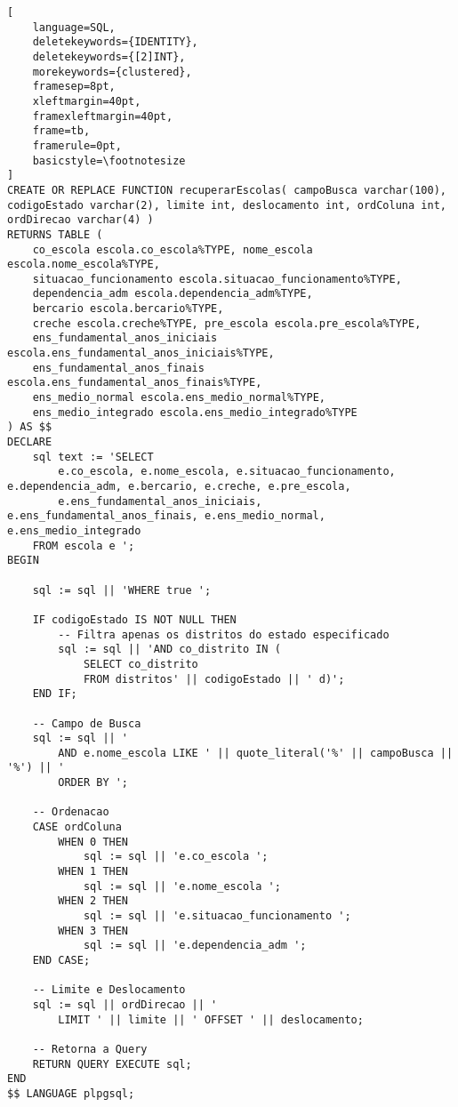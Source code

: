 \documentclass[12pt,a4paper]{article}
\begin{document}
\vspace{0.5cm}

\begin{lstlisting}[ 
    language=SQL,
    deletekeywords={IDENTITY},
    deletekeywords={[2]INT},
    morekeywords={clustered},
    framesep=8pt,
    xleftmargin=40pt,
    framexleftmargin=40pt,
    frame=tb,
    framerule=0pt,
    basicstyle=\footnotesize
]
CREATE OR REPLACE FUNCTION recuperarEscolas( campoBusca varchar(100), codigoEstado varchar(2), limite int, deslocamento int, ordColuna int, ordDirecao varchar(4) )  
RETURNS TABLE (
    co_escola escola.co_escola%TYPE, nome_escola escola.nome_escola%TYPE,
    situacao_funcionamento escola.situacao_funcionamento%TYPE,
    dependencia_adm escola.dependencia_adm%TYPE, 
    bercario escola.bercario%TYPE,
    creche escola.creche%TYPE, pre_escola escola.pre_escola%TYPE,
    ens_fundamental_anos_iniciais escola.ens_fundamental_anos_iniciais%TYPE,
    ens_fundamental_anos_finais escola.ens_fundamental_anos_finais%TYPE,
    ens_medio_normal escola.ens_medio_normal%TYPE,
    ens_medio_integrado escola.ens_medio_integrado%TYPE
) AS $$
DECLARE
    sql text := 'SELECT
        e.co_escola, e.nome_escola, e.situacao_funcionamento, e.dependencia_adm, e.bercario, e.creche, e.pre_escola,
        e.ens_fundamental_anos_iniciais, e.ens_fundamental_anos_finais, e.ens_medio_normal, e.ens_medio_integrado
    FROM escola e ';
BEGIN

    sql := sql || 'WHERE true ';

    IF codigoEstado IS NOT NULL THEN
        -- Filtra apenas os distritos do estado especificado 
        sql := sql || 'AND co_distrito IN (
            SELECT co_distrito
            FROM distritos' || codigoEstado || ' d)';
    END IF;

    -- Campo de Busca
    sql := sql || '
        AND e.nome_escola LIKE ' || quote_literal('%' || campoBusca || '%') || '
        ORDER BY ';

    -- Ordenacao
    CASE ordColuna
        WHEN 0 THEN
            sql := sql || 'e.co_escola ';
        WHEN 1 THEN
            sql := sql || 'e.nome_escola ';
        WHEN 2 THEN
            sql := sql || 'e.situacao_funcionamento ';
        WHEN 3 THEN
            sql := sql || 'e.dependencia_adm ';
    END CASE;

    -- Limite e Deslocamento
    sql := sql || ordDirecao || '
        LIMIT ' || limite || ' OFFSET ' || deslocamento;

    -- Retorna a Query
    RETURN QUERY EXECUTE sql;
END
$$ LANGUAGE plpgsql;
\end{lstlisting}
\end{document}
